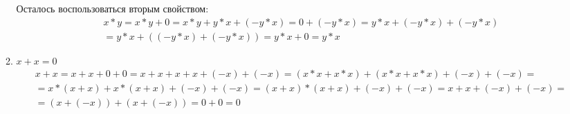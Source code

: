 \begin{enumerate}
\begin{enumerate}
Осталось воспользоваться вторым свойством:
\begin{align*}
&x * y = x * y + 0 = x * y + y * x + (-y * x) = 0 + (-y * x) = y * x + (-y * x) + (-y * x) \\
&= y * x + ((-y * x) + (-y * x)) = y * x + 0 = y * x
\end{align*}

\item $x + x = 0$
\begin{align*}
&x + x = x + x + 0 + 0 = x + x + x + x + (-x) + (-x) = (x * x + x * x) + (x * x + x * x) + (-x) + (-x) = \\
&= x*(x + x) + x*(x + x) + (-x) + (-x) = (x + x)*(x + x) + (-x) + (-x) = x + x + (-x) + (-x) = \\
&= (x + (-x)) + (x + (-x)) = 0 + 0 = 0
\end{align*}
\end{enumerate}

\end{enumerate}

